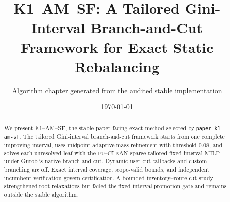 \documentclass[11pt]{article}
\title{K1--AM--SF: A Tailored Gini-Interval Branch-and-Cut Framework for Exact Static Rebalancing}
\author{Algorithm chapter generated from the audited stable implementation}
\date{\today}
\begin{document}
\maketitle
\begin{abstract}
We present K1--AM--SF, the stable paper-facing exact method selected by
\texttt{paper-k1-am-sf}. The tailored Gini-interval branch-and-cut framework
starts from one complete improving interval, uses midpoint adaptive-mass
refinement with threshold $0.08$, and solves each unresolved leaf with the
F0--CLEAN sparse tailored fixed-interval MILP under Gurobi's native
branch-and-cut. Dynamic user-cut callbacks and custom branching are off. Exact
interval coverage, scope-valid bounds, and independent incumbent verification
govern certification. A bounded inventory--route cut study strengthened root
relaxations but failed the fixed-interval promotion gate and remains outside
the stable algorithm.
\end{abstract}








\end{document}
